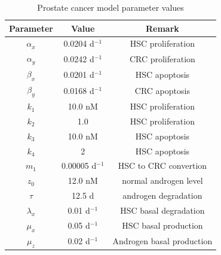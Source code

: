 \begin{table}[h]
\caption{Prostate cancer model parameter values\label{prostate}}
\centering
\begin{tabular}{c|c|c}
\hline
Parameter  & Value & Remark  \\\hline
$\alpha_x$ & 0.0204 d$^{-1}$ & HSC proliferation \\
$\alpha_y$ & 0.0242 d$^{-1}$ & CRC proliferation  \\
$\beta_x$  & 0.0201 d$^{-1}$ & HSC apoptosis  \\
$\beta_y$  & 0.0168 d$^{-1}$ & CRC apoptosis \\
$k_1$     & 10.0 nM & HSC proliferation  \\
$k_2$     & 1.0 & HSC proliferation  \\
$k_3$     & 10.0 nM & HSC apoptosis  \\
$k_4$     &  2 & HSC apoptosis   \\
$m_1$     & 0.00005 d$^{-1}$ & HSC to CRC convertion  \\
$z_0$     & 12.0 nM & normal androgen level  \\
$\tau$     & 12.5 d & androgen degradation  \\
$\lambda_x$     & 0.01 d$^{-1}$ & HSC basal degradation \\
$\mu_x$     & 0.05 d$^{-1}$ & HSC basal production\\
$\mu_z$     & 0.02 d$^{-1}$ & Androgen basal production \\
\hline
\end{tabular}
\end{table}
